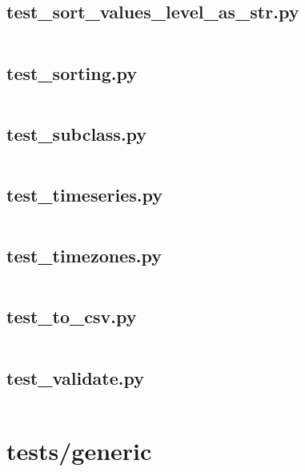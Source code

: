 \documentclass{article}
\begin{document}
\subsection{test\_sort\_values\_level\_as\_str.py}
\inputminted{python}{/home/dufferzafar/dev/@clones/pandas/pandas/tests/frame/test_sort_values_level_as_str.py}
\newpage

\subsection{test\_sorting.py}
\inputminted{python}{/home/dufferzafar/dev/@clones/pandas/pandas/tests/frame/test_sorting.py}
\newpage

\subsection{test\_subclass.py}
\inputminted{python}{/home/dufferzafar/dev/@clones/pandas/pandas/tests/frame/test_subclass.py}
\newpage

\subsection{test\_timeseries.py}
\inputminted{python}{/home/dufferzafar/dev/@clones/pandas/pandas/tests/frame/test_timeseries.py}
\newpage

\subsection{test\_timezones.py}
\inputminted{python}{/home/dufferzafar/dev/@clones/pandas/pandas/tests/frame/test_timezones.py}
\newpage

\subsection{test\_to\_csv.py}
\inputminted{python}{/home/dufferzafar/dev/@clones/pandas/pandas/tests/frame/test_to_csv.py}
\newpage

\subsection{test\_validate.py}
\inputminted{python}{/home/dufferzafar/dev/@clones/pandas/pandas/tests/frame/test_validate.py}
\newpage

\section{tests/generic}
\end{document}
